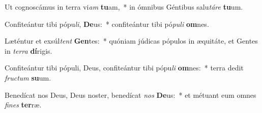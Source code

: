 \item Ut cognoscámus in terra vi\textit{am} \textbf{tu}am,~* in ómnibus Géntibus salu\textit{tá}\textit{re} \textbf{tu}um.
\item Confiteántur tibi pópu\textit{li}, \textbf{De}us:~* confiteántur tibi pó\textit{pu}\textit{li} \textbf{om}nes.
\item Læténtur et exsúl\textit{tent} \textbf{Gen}tes:~* quóniam júdicas pópulos in æquitáte, et Gentes in \textit{ter}\textit{ra} \textbf{dí}rigis.
\item Confiteántur tibi pópuli, Deus, confiteántur tibi pópu\textit{li} \textbf{om}nes:~* terra dedit \textit{fruc}\textit{tum} \textbf{su}um.
\item Benedícat nos Deus, Deus noster, benedícat \textit{nos} \textbf{De}us:~* et métuant eum omnes \textit{fi}\textit{nes} \textbf{ter}ræ.
